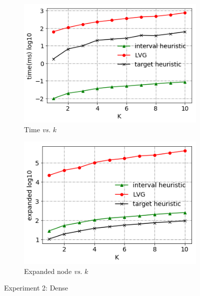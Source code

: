 \begin{figure}[!htbp]
    \centering

    \begin{subfigure}[b]{0.5\textwidth}
        \centering
        \includegraphics[width=.7\textwidth]{pic/e2_dense_time.png}
        \caption{Time \textit{vs.} $k$}
        \label{e2_dense_time}
    \end{subfigure}%
    \hfill
    \begin{subfigure}[b]{0.5\textwidth}
        \centering
        \includegraphics[width=.7\textwidth]{pic/e2_dense_gen.png}
        \caption{Expanded node \textit{vs.} $k$}
        \label{e2_dense_gen}
    \end{subfigure}
    \caption{Experiment 2: Dense}
\end{figure}


